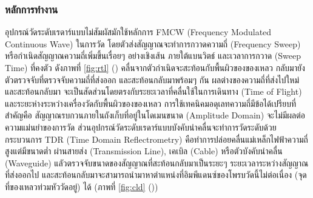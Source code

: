 \documentclass[final,11pt]{article}
\begin{document}
\subsubsection{หลักการทำงาน} 
อุปกรณ์วัดระดับเรดาร์แบบไม่สัมผัสมักใช้หลักการ FMCW (Frequency Modulated Continuous Wave) ในการวัด 
โดยตัวส่งสัญญาณจะทำการกวาดความถี่ (Frequency Sweep) หรือกำเนิดสัญญาณความถี่เพิ่มขึ้นเรื่อยๆ อย่างเชิงเส้น ภายใต้แบนวิตธ์ และเวลาการกวาด
(Sweep Time) ที่คงตัว ดังภาพที่ \ref{fig:rtl} () คลื่นจากตัวกำเนิดจะสะท้อนกับพื้นผิวของของเหลว กลับมายังตัวตรวจจับที่ตรวจจับความถี่ที่ส่งออก และสะท้อนกลับมาพร้อมๆ กัน
ผลต่างของความถี่ที่ส่งไปใหม่ และสะท้อนกลับมา จะเป็นสัดส่วนโดยตรงกับระยะเวลาที่คลื่นใช้ในการเดินทาง (Time of Flight) 
และระยะห่างระหว่างเครื่องวัดกับพื้นผิวของของเหลว การใช้เทคนิคมอดุเลทความถี่มีข้อได้เปรียบที่สำคัญคือ สัญญาณรบกวนภายในถังเก็บที่อยู่ในโดเมนขนาด 
(Amplitude Domain) จะไม่มีผลต่อความแม่นยำของการวัด ส่วนอุปกรณ์วัดระดับเรดาร์แบบบังคับนำคลื่นจะทำการวัดระดับด้วยกระบวนการ TDR 
(Time Domain Reflectrometry) คือทำการปล่อยคลื่นแม่เหล็กไฟฟ้าความถี่สูงแต่มีขนาดต่ำ ผ่านสายส่ง (Transmission Line), เคเบิล (Cable) 
หรือตัวบังคับนำคลื่น (Waveguide) แลัวตรวจจับขนาดของสัญญาณที่สะท้อนกลับมาเป็นระยะๆ ระยะเวลาระหว่างสัญญาณที่ส่งออกไป 
และสะท้อนกลับมาจะสามารถนำมาหาตำแหน่งที่อิมพีแดนซ์ของโพรบวัดนี้ไม่ต่อเนื่อง (จุดที่ของเหลวท่วมหัววัดอยู่) ได้ (ภาพที่ \ref{fig:cld} ())
\end{document}
